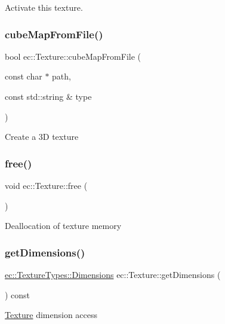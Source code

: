 Activate this texture. \mbox{\label{classec_1_1_texture_ae84b0f18fa11275f09e4c8ea3dc89e02}} 
\subsubsection{\texorpdfstring{cube\+Map\+From\+File()}{cubeMapFromFile()}}
{\footnotesize\ttfamily bool ec\+::\+Texture\+::cube\+Map\+From\+File (\begin{DoxyParamCaption}\item[{const char $\ast$}]{path,  }\item[{const std\+::string \&}]{type }\end{DoxyParamCaption})}

Create a 3D texture \mbox{\label{classec_1_1_texture_a57242daae8cc1ea827848f9b7f7b7fbb}} 
\subsubsection{\texorpdfstring{free()}{free()}}
{\footnotesize\ttfamily void ec\+::\+Texture\+::free (\begin{DoxyParamCaption}{ }\end{DoxyParamCaption})}

Deallocation of texture memory \mbox{\label{classec_1_1_texture_a5d1e6d8dd6c98ea036caf2696e47637a}} 
\subsubsection{\texorpdfstring{get\+Dimensions()}{getDimensions()}}
{\footnotesize\ttfamily \mbox{\hyperlink{structec_1_1_texture_types_ac0e07f24452fa28dd8e6e33a224842fc}{ec\+::\+Texture\+Types\+::\+Dimensions}} ec\+::\+Texture\+::get\+Dimensions (\begin{DoxyParamCaption}{ }\end{DoxyParamCaption}) const}

\mbox{\hyperlink{classec_1_1_texture}{Texture}} dimension access \mbox{\label{classec_1_1_texture_a0097b0b1826d7339ae109a187b6304d5}} 
